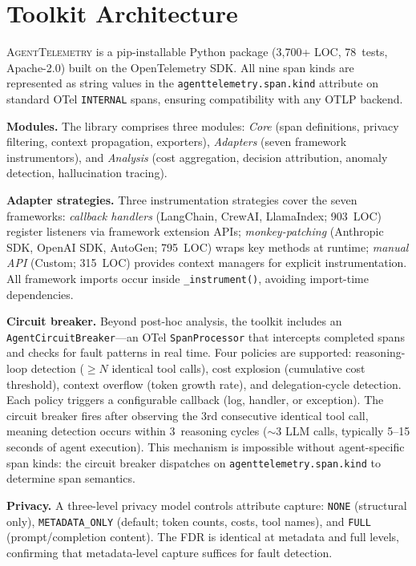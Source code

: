 \documentclass[sigconf,screen]{acmart}
\begin{document}
\section{Toolkit Architecture}
\label{sec:toolkit}

\textsc{AgentTelemetry} is a pip-installable Python package (3{,}700+
LOC, 78~tests, Apache-2.0) built on the OpenTelemetry SDK.  All nine
span kinds are represented as string values in the
\texttt{agenttelemetry.span.kind} attribute on standard OTel
\texttt{INTERNAL} spans, ensuring compatibility with any OTLP backend.

\textbf{Modules.}
The library comprises three modules: \emph{Core} (span definitions,
privacy filtering, context propagation, exporters),
\emph{Adapters} (seven framework instrumentors), and
\emph{Analysis} (cost aggregation, decision attribution, anomaly
detection, hallucination tracing).

\textbf{Adapter strategies.}
Three instrumentation strategies cover the seven frameworks:
\emph{callback handlers} (LangChain,
CrewAI, LlamaIndex; 903~LOC) register listeners via framework extension
APIs; \emph{monkey-patching} (Anthropic SDK, OpenAI SDK, AutoGen;
795~LOC) wraps key methods at runtime; \emph{manual API} (Custom;
315~LOC) provides context managers for explicit instrumentation.
All framework imports occur inside \texttt{\_instrument()}, avoiding
import-time dependencies.

\textbf{Circuit breaker.}
Beyond post-hoc analysis, the toolkit includes an
\texttt{AgentCircuitBreaker}---an OTel \texttt{SpanProcessor} that
intercepts completed spans and checks for fault patterns in real time.
Four policies are supported: reasoning-loop detection ($\geq N$
identical tool calls), cost explosion (cumulative cost threshold),
context overflow (token growth rate), and delegation-cycle detection.
Each policy triggers a configurable callback (log, handler, or
exception).  The circuit breaker fires after observing the 3rd
consecutive identical tool call, meaning detection occurs within
3~reasoning cycles ($\sim$3 LLM calls, typically 5--15 seconds of
agent execution).
This mechanism is impossible without agent-specific span
kinds: the circuit breaker dispatches on
\texttt{agenttelemetry.span.kind} to determine span semantics.

\textbf{Privacy.}
A three-level privacy model controls attribute capture: \texttt{NONE}
(structural only), \texttt{METADATA\_ONLY} (default; token counts, costs,
tool names), and \texttt{FULL} (prompt/completion content).  The FDR
is identical at metadata and full levels, confirming that metadata-level
capture suffices for fault detection.
\end{document}
